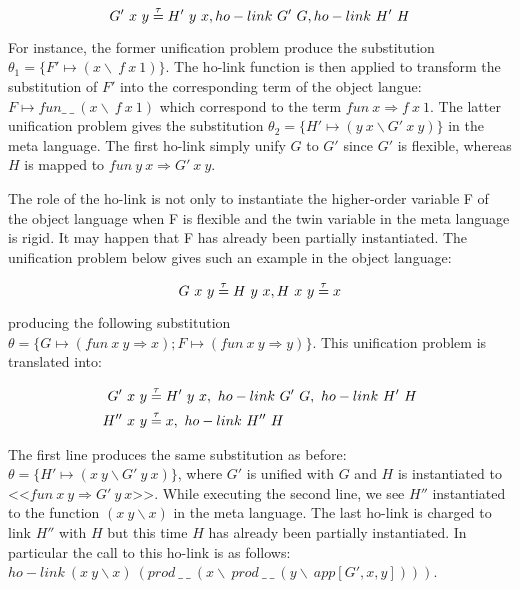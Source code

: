 \documentclass{rapport}
\begin{document}
\begin{equation}
  G'\ x\ y \eqtau H'\ y\ x, ho-link\ G'\ G, ho-link\ H'\ H
  \label{eq:unif-ho-elpi2'}
\end{equation}

For instance, the former unification problem produce the substitution $\theta_1
= \{F' \mapsto (x\backslash\ f\ x\ 1)\}$. The ho-link function is then applied
to transform the substitution of $F'$ into the corresponding term of the object
langue: $F \mapsto fun \_\ \_\ (x\backslash\ f\ x\ 1)$ which correspond to the
term $fun\ x \Rightarrow f\ x\ 1$. The latter unification problem gives the
substitution $\theta_2 = \{H' \mapsto (y\ x \backslash G'\ x\ y)\}$ in the
meta language. The first ho-link simply unify $G$ to $G'$ since $G'$ is
flexible, whereas $H$ is mapped to $fun\ y\ x \Rightarrow G'\ x\ y$.

The role of the ho-link is not only to instantiate the higher-order variable F
of the object language when F is flexible and the twin variable in the meta
language is rigid. It may happen that F has already been partially instantiated.
The unification problem below gives such an example in the object language:

\begin{equation}
  G\ x\ y \mathrel{\overset{\mathrm{\tau}}{=}} H\ y\ x, H\ x\ y \mathrel{\overset{\mathrm{\tau}}{=}} x 
  \label{eq:unif-ho-coq4}
\end{equation}

\noindent producing the following substitution $\theta = \{G \mapsto (fun\ x\
y\Rightarrow x); F \mapsto (fun\ x\ y\Rightarrow y)\}$. This unification problem
is translated into:

\begin{equation}
  \begin{split}
    G'\ x\ y &\mathrel{\overset{\mathrm{\tau}}{=}} H'\ y\ x,\ ho-link\ G'\ G,\ ho-link\ H'\ H\\
    H''\ x\ y &\mathrel{\overset{\mathrm{\tau}}{=}} x,\ ho-link\ H''\ H
  \end{split}
  \label{eq:unif-ho-elpi4}
\end{equation}

\noindent The first line produces the same substitution as before: $\theta = \{H'
\mapsto (x\ y \backslash G'\ y\ x)\}$, where $G'$ is unified with $G$ and $H$ is
instantiated to <<$fun\ x\ y \Rightarrow G'\ y\ x$>>. While executing the second
line, we see $H''$ instantiated to the function $(x\ y\backslash x)$ in the
meta language. The last ho-link is charged to link $H''$ with $H$ but this
time $H$ has already been partially instantiated. In particular the call to this
ho-link is as follows: $ho-link\ (x\ y\backslash x)\
(prod\ \_\ \_\ (x\backslash\ prod\ \_\ \_\ (y\backslash\ app [G', x, y])))$.
\end{document}
